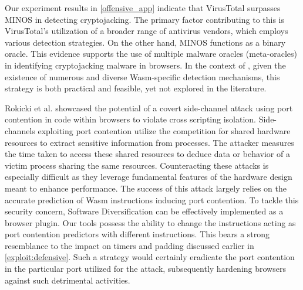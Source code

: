 \begin{strategy}
    \label{meta-oracles}
    Our experiment results in \autoref{offensive_app}  indicate that VirusTotal surpasses MINOS in detecting \Wasm cryptojacking. 
    The primary factor contributing to this is VirusTotal's utilization of a broader range of antivirus vendors, which employs various detection strategies. 
    On the other hand, MINOS functions as a binary oracle. 
    This evidence supports the use of multiple malware oracles (meta-oracles) in identifying cryptojacking malware in browsers. 
    In the context of \Wasm, given the existence of numerous and diverse Wasm-specific detection mechanisms, this strategy is both practical and feasible, yet not explored in the literature.
\end{strategy}
    
\begin{strategy}
    Rokicki et al. \cite{10.1145/3488932.3517411} showcased the potential of a covert side-channel attack using port contention in \Wasm code within browsers to violate cross scripting isolation.
    Side-channels exploiting port contention utilize the competition for shared hardware resources to extract sensitive information from processes. 
    The attacker measures the time taken to access these shared resources to deduce data or behavior of a victim process sharing the same resources. 
    Counteracting these attacks is especially difficult as they leverage fundamental features of the hardware design meant to enhance performance. 
    The success of this attack largely relies on the accurate prediction of Wasm instructions inducing port contention. 
    To tackle this security concern, \Wasm Software Diversification can be effectively implemented as a browser plugin. 
    Our tools possess the ability to change the \Wasm instructions acting as port contention predictors with different instructions. 
    This bears a strong resemblance to the impact on timers and padding discussed earlier in \autoref{exploit:defensive}. 
    Such a strategy would certainly eradicate the port contention in the particular port utilized for the attack, subsequently hardening browsers against such detrimental activities.

\end{strategy}


\begin{comment}
    
    \wrule{Dataset augmentation:} The \Wasm ecosystem is still in its infancy compared to more mature programming environments. 
    The study by Hilbig et al. in 2021 found only 8,000 unique \Wasm binaries globally\cite{Hilbig2021AnES}, a fraction of the 1.5 million and 1.7 million packages available in npm and PyPI, respectively. 
    This limited dataset poses challenges for machine learning-based analysis tools, which require extensive data for effective training. 
    The scarcity of \Wasm programs also exacerbates the problem of software monoculture, increasing the risk of compromised \Wasm programs being consumed\cite{usenixWasm2020}. 
\end{comment}


